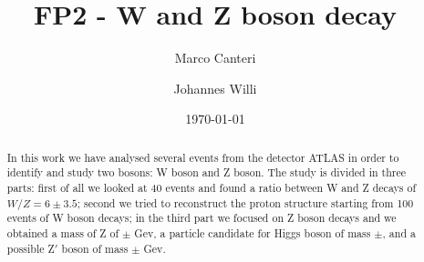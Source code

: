 \documentclass[%
 reprint,
 amsmath,amssymb,
 aps,
]{revtex4-1}
\begin{document}

\title{FP2 - W and Z boson decay}%


\author{Marco Canteri}

\author{Johannes Willi}

\date{\today}%

\begin{abstract}
In this work we have analysed several events from the detector ATLAS in order to identify and study two bosons: W boson and Z boson. The study is divided in three parts: first of all
we looked at 40 events and found a ratio between W and Z decays of $W/Z = 6 \pm 3.5$; second we tried to reconstruct the proton structure starting from 100 events of W boson decays; in the third part we focused on Z boson decays and we obtained a mass of Z of $\pm $ Gev, a particle candidate for Higgs boson of mass $\pm$, and a possible Z$'$ boson of mass $\pm$ Gev.
\end{abstract}
\maketitle

\end{document}
